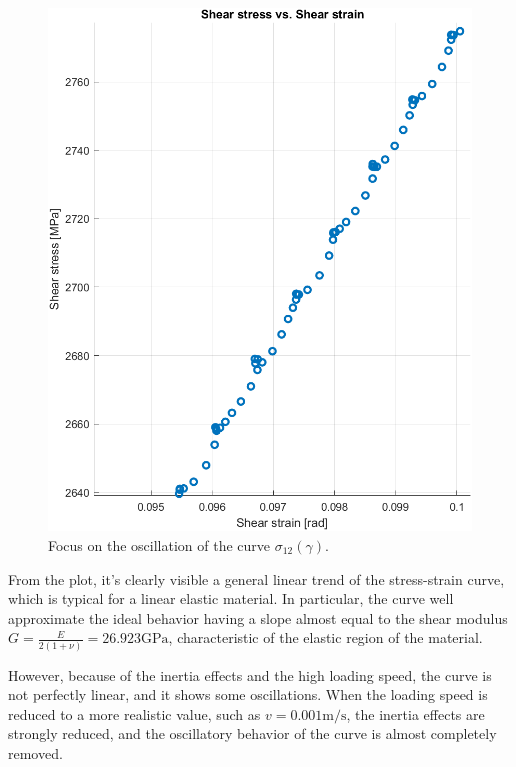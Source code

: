 \begin{figure}[H]
\begin{minipage}[b]{0.45\textwidth}
        \includegraphics[width=\textwidth]{img/shear_stress_vs_strain_focus.png}
        \caption{Focus on the oscillation of the curve $\sigma_{12}(\gamma)$.}
        \label{fig:shear_stress_vs_strain_focus}
    \end{minipage}

\end{figure}

From the plot, it's clearly visible a general linear trend of the stress-strain curve, which is typical for a linear elastic material.
In particular, the curve well approximate the ideal behavior having a slope almost equal to the shear modulus $G = \frac{E}{2(1 + \nu)} = 26.923 \text{GPa}$, characteristic of the elastic region of the material.

However, because of the inertia effects and the high loading speed, the curve is not perfectly linear, and it shows some oscillations.
When the loading speed is reduced to a more realistic value, such as $v = 0.001 \text{m/s}$, the inertia effects are strongly reduced, and the oscillatory behavior of the curve is almost completely removed.


